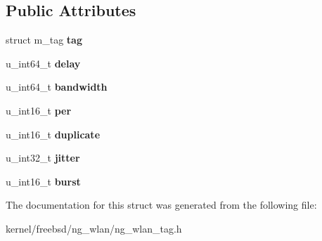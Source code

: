 \subsection*{Public Attributes}
\begin{DoxyCompactItemize}
\item 
\hypertarget{structng__wlan__tag_a6c31473595a9867404cd40a565907101}{struct m\+\_\+tag {\bfseries tag}}\label{structng__wlan__tag_a6c31473595a9867404cd40a565907101}

\item 
\hypertarget{structng__wlan__tag_ad28e21eccab2181f310eac4f29c9df52}{u\+\_\+int64\+\_\+t {\bfseries delay}}\label{structng__wlan__tag_ad28e21eccab2181f310eac4f29c9df52}

\item 
\hypertarget{structng__wlan__tag_aa243746201c698c155f66aaed771cb36}{u\+\_\+int64\+\_\+t {\bfseries bandwidth}}\label{structng__wlan__tag_aa243746201c698c155f66aaed771cb36}

\item 
\hypertarget{structng__wlan__tag_a0e2a0f77f5b8fe8c25b2c0d9236792f5}{u\+\_\+int16\+\_\+t {\bfseries per}}\label{structng__wlan__tag_a0e2a0f77f5b8fe8c25b2c0d9236792f5}

\item 
\hypertarget{structng__wlan__tag_a227b0e4aa34c99bfdcb96b557a4b5004}{u\+\_\+int16\+\_\+t {\bfseries duplicate}}\label{structng__wlan__tag_a227b0e4aa34c99bfdcb96b557a4b5004}

\item 
\hypertarget{structng__wlan__tag_a681a3ada1835e227c6bdb4e3f09c00ac}{u\+\_\+int32\+\_\+t {\bfseries jitter}}\label{structng__wlan__tag_a681a3ada1835e227c6bdb4e3f09c00ac}

\item 
\hypertarget{structng__wlan__tag_abe4f328aed267631bf991184ff0cce32}{u\+\_\+int16\+\_\+t {\bfseries burst}}\label{structng__wlan__tag_abe4f328aed267631bf991184ff0cce32}

\end{DoxyCompactItemize}


The documentation for this struct was generated from the following file\+:\begin{DoxyCompactItemize}
\item 
kernel/freebsd/ng\+\_\+wlan/ng\+\_\+wlan\+\_\+tag.\+h\end{DoxyCompactItemize}
